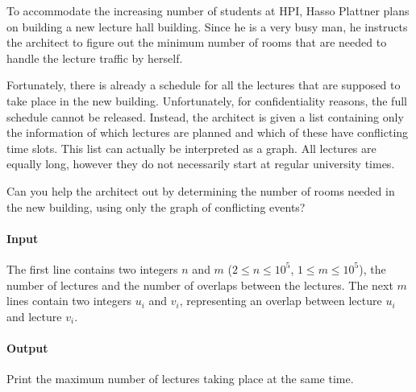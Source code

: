 



\makeheader

To accommodate the increasing number of students at HPI, Hasso Plattner plans on building a new lecture hall building. Since he is a very busy man, he instructs the architect to figure out the minimum number of rooms that are needed to handle the lecture traffic by herself.

Fortunately, there is already a schedule for all the lectures that are supposed to take place in the new building.
Unfortunately, for confidentiality reasons, the full schedule cannot be released. Instead, the architect is given a list containing only the information of which lectures are planned and which of these have conflicting time slots. This list can actually be interpreted as a graph. All lectures are equally long, however they do not necessarily start at regular university times.

Can you help the architect out by determining the number of rooms needed in the new building, using only the graph of conflicting events?

\paragraph*{Input}

The first line contains two integers $n$ and $m$ ($2 \leq n \leq 10^5$, $1 \leq m \leq 10^5$), the number of lectures and the number of overlaps between the lectures.
The next $m$ lines contain two integers $u_i$ and $v_i$, representing an overlap between lecture $u_i$ and lecture $v_i$. 

\paragraph*{Output}

Print the maximum number of lectures taking place at the same time.

\begin{samples}
\end{samples}


